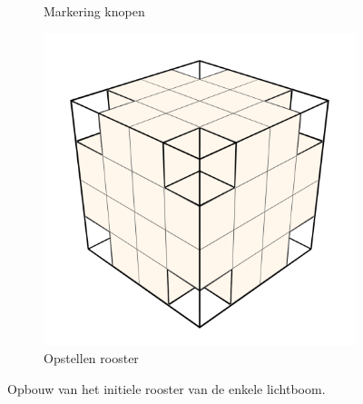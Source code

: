 \begin{figure}[p]
\begin{subfigure}[b]{.3\linewidth}
    \caption{Markering knopen}%
    \label{fig:hs-p1h}%
  \end{subfigure}
  \begin{subfigure}[b]{.3\linewidth}
    \includegraphics[width=\textwidth]{./img/raw/hs-slt-algorithm/hs-slt-algorithm-9.png}%
    \caption{Opstellen rooster}%
    \label{fig:hs-p1i}%
  \end{subfigure}

  \caption{Opbouw van het initiele rooster van de enkele lichtboom.}
  \label{fig:hs-p1}
\end{figure}
